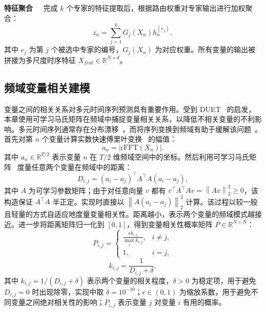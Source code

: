 \noindent\textbf{特征聚合\ \ } 完成 $k$ 个专家的特征提取后，根据路由权重对专家输出进行加权聚合：
\begin{equation}
{z}_n=\sum_{j=1}^{k}G_j\!\left(X_n\right){h}_n^{(e_j)},
\end{equation}
其中 $e_j$ 为第 $j$ 个被选中专家的编号，$G_j(X_n)$ 为对应权重。所有变量的输出被拼接为多尺度时序特征 $X_{feat}\in\mathbb{R}^{N\times d}$。

\subsection{频域变量相关建模}
\label{sec:ch3_mcm}

变量之间的相关关系对多元时间序列预测具有重要作用。受到 DUET~\cite{duet} 的启发，本章使用可学习马氏矩阵在频域中捕捉变量相关关系，以降低不相关变量的不利影响。多元时间序列通常存在分布漂移~\cite{revin,adarnn}，而将序列变换到频域有助于缓解该问题~\cite{filternet,frets}。首先对第 $n$ 个变量计算实数快速傅里叶变换~\cite{rfft} 的幅值：
\begin{equation}
{a}_n=\left|\mathrm{rFFT}\!\left(X_n\right)\right|.
\end{equation}
其中 ${a}_n\in\mathbb{R}^{T/2}$ 表示变量 $n$ 在 $T/2$ 维频域空间中的坐标。然后利用可学习马氏矩阵~\cite{hinton_2004_maha} 度量任意两个变量在频域中的距离：
\begin{equation}
D_{i,j}=\left({a}_i-{a}_j\right)^{\top}{A}^{\top}{A}\left({a}_i-{a}_j\right),
\end{equation}
其中 ${A}$ 为可学习参数矩阵；由于对任意向量 $v$ 都有 $v^{\top}A^{\top}A v=\left\|Av\right\|_{2}^{2}\geq 0$，该构造保证 ${A}^{\top}{A}$ 半正定。实现时直接以 $\left\|{A}\left({a}_i-{a}_j\right)\right\|_{2}^{2}$ 计算。该过程以较一般且轻量的方式自适应地度量变量相关性。距离越小，表示两个变量的频域模式越接近。进一步将距离矩阵归一化到 $[0,1]$，得到变量相关性概率矩阵 ${P}\in\mathbb{R}^{N\times N}$：
\begin{equation}
P_{i,j}=
\left\{
\begin{array}{ll}
\frac{\epsilon k_{i,j}}{\max_j k_{i,j}}, & i\neq j,\\
1, & i=j,
\end{array}
\right.
\end{equation}
\begin{equation}
k_{i,j}=\frac{1}{D_{i,j}+\delta},
\end{equation}
其中 $k_{i,j}=1/(D_{i,j}+\delta)$ 表示两个变量的相关程度，$\delta>0$ 为稳定项，用于避免 $D_{i,j}=0$ 时出现除零，实现中取 $\delta=10^{-10}$；$\epsilon\in(0,1)$ 为缩放系数，用于避免不同变量之间绝对相关性的影响；$P_{i,j}$ 表示变量 $j$ 对变量 $i$ 有用的概率。

